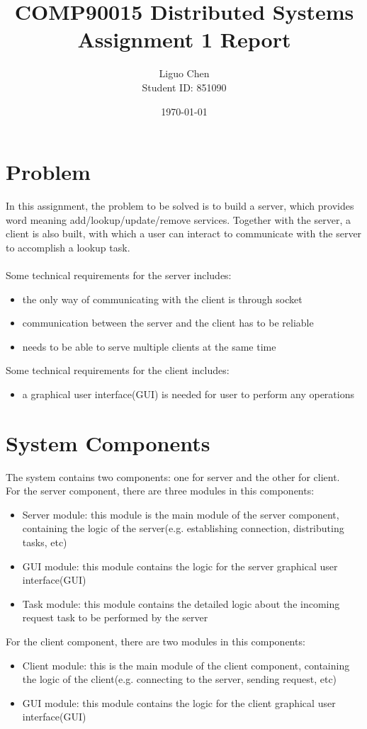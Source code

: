 \documentclass{article}
\title{COMP90015 Distributed Systems \\ 
       Assignment 1 Report}
\author{Liguo Chen\\Student ID: 851090}
\date{\today}
\begin{document}
\maketitle

\section*{Problem}
In this assignment, the problem to be solved is to build a server, which provides word meaning add/lookup/update/remove services. Together with the server, a client is also built, with which a user can interact to communicate with the server to accomplish a lookup task.\\\\
Some technical requirements for the server includes:
\begin{itemize}
    \item the only way of communicating with the client is through socket
    \item communication between the server and the client has to be reliable
    \item needs to be able to serve multiple clients at the same time
\end{itemize}
Some technical requirements for the client includes:
\begin{itemize}
    \item a graphical user interface(GUI) is needed for user to perform any operations
\end{itemize}

\section*{System Components}
The system contains two components: one for server and the other for client.\\
For the server component, there are three modules in this components:
\begin{itemize}
    \item Server module: this module is the main module of the server component, containing the logic of the server(e.g. establishing connection, distributing tasks, etc)
    \item GUI module: this module contains the logic for the server graphical user interface(GUI)
    \item Task module: this module contains the detailed logic about the incoming request task to be performed by the server
\end{itemize}
For the client component, there are two modules in this components:
\begin{itemize}
    \item Client module: this is the main module of the client component, containing the logic of the client(e.g. connecting to the server, sending request, etc)
    \item GUI module: this module contains the logic for the client graphical user interface(GUI)
\end{itemize}
\end{document}

